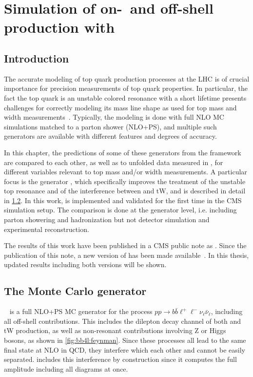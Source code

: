 \chapter{Simulation of on-~and off-shell \ttbartitle production with \texorpdfstring{\bbfourl}{bb4l}}
\label{ch:bb4l}

\section{Introduction}

The accurate modeling of top quark production processes at the LHC is of crucial importance for precision measurements of top quark properties. In particular, the fact the top quark is an unstable colored resonance with a short lifetime presents challenges for correctly modeling its mass line shape as used for top mass and width measurements~\cite{Tarrach:1980up,Smith:1996xz,Hoang:2020iah}. Typically, the modeling is done with full NLO MC simulations matched to a parton shower (NLO+PS), and multiple such generators are available with different features and degrees of accuracy.

In this chapter, the predictions of some of these generators from the \powheg framework~\cite{Powheg:2004,Powheg:2007} are compared to each other, as well as to unfolded data measured in , for different variables relevant to top mass and/or width measurements. A particular focus is the generator \bbfourl \cite{Jezo:2016ujg}, which specifically improves the treatment of the unstable top resonance and of the interference between \ttbar and tW, and is described in detail in \cref{sec:bb4l:bb4l}. In this work, \bbfourl is implemented and validated for the first time in the CMS simulation setup. The comparison is done at the generator level, i.e. including parton showering and hadronization but not detector simulation and experimental reconstruction.

The results of this work have been published in a CMS public note as . Since the publication of this note, a new version of \bbfourl has been made available~\cite{Jezo:2023rht}. In this thesis, updated results including both versions will be shown.

\section{The Monte Carlo generator \texorpdfstring{\bbfourl}{bb4l}}
\label{sec:bb4l:bb4l}

\bbfourl ~\cite{Jezo:2016ujg,Jezo:2023rht} is a full NLO+PS MC generator for the process $pp \to b \bar{b} \ell^+ \ell^- \nu_\ell \bar{\nu}_\ell$, including all off-shell contributions. This includes the dilepton decay channel of both \ttbar and tW production, as well as non-resonant contributions involving Z or Higgs bosons, as shown in \cref{fig:bb4l:feynman}. Since these processes all lead to the same final state at NLO in QCD, they interfere which each other and cannot be easily separated. \bbfourl includes this interference by construction since it computes the full amplitude including all diagrams at once.

